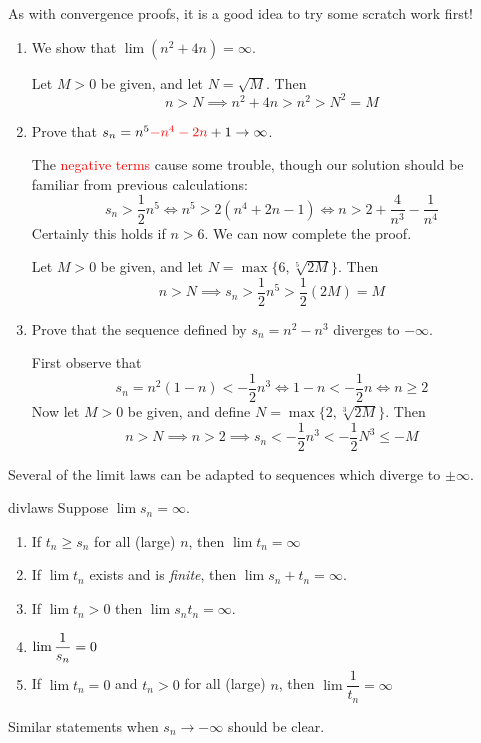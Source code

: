 \begin{examples}{}{}
	As with convergence proofs, it is a good idea to try some scratch work first!
	\begin{enumerate}
	  \item We show that $\lim (n^2+4n)=\infty$.\par
	  Let $M>0$ be given, and let $N=\sqrt M$. Then
		\[n>N\implies n^2+4n>n^2>N^2=M\]
	
		\item Prove that $s_n=n^5\textcolor{red}{-n^4-2n}+1\to\infty$.\par
		The \textcolor{red}{negative terms} cause some trouble, though our solution should be familiar from previous calculations:  
		\[s_n>\frac 12n^5\iff n^5>2(n^4+2n-1)\iff n>2+\frac 4{n^3}-\frac 1{n^4}\]
		Certainly this holds if $n>6$. We can now complete the proof.\par
		Let $M>0$ be given, and let $N=\max\{6,\sqrt[5]{2M}\}$. Then
		\[n>N\implies s_n>\frac 12n^5 >\frac 12(2M)=M\]
		
		\item Prove that the sequence defined by $s_n=n^2-n^3$ diverges to $-\infty$.\par
		First observe that
		\[s_n=n^2(1-n)<-\frac 12n^3\iff 1-n<-\frac 12n\iff n\ge 2\]
		Now let $M>0$ be given,\footnotemark{} and define $N=\max\{2,\sqrt[3]{2M}\}$. Then
		\[n>N\implies n>2\implies s_n<-\frac 12n^3<-\frac 12N^3\le -M\]
	\end{enumerate}
\end{examples}

\vspace{-13pt}


\goodbreak


Several of the limit laws can be adapted to sequences which diverge to $\pm\infty$.

\begin{thm}{}{divlaws}
	Suppose $\lim s_n=\infty$.
	\begin{enumerate}
		\item\label{thm:divlaws1} If $t_n\ge s_n$ for all (large) $n$, then $\lim t_n=\infty$
		\item If $\lim t_n$ exists and is \emph{finite}, then $\lim s_n+t_n=\infty$.
		\item If $\lim t_n>0$ then $\lim s_nt_n=\infty$.
		\item $\smash[b]{\lim\dfrac 1{s_n}=0}$
		\item If $\lim t_n=0$ and $t_n>0$ for all (large) $n$, then $\lim\dfrac 1{t_n}=\infty$
	\end{enumerate}
	Similar statements when $s_n\to-\infty$ should be clear.
\end{thm}

